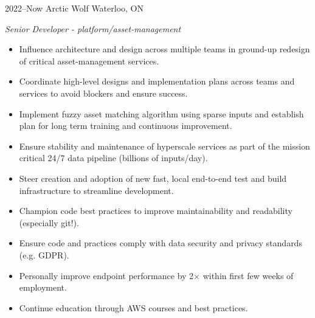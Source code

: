 \documentclass[a4paper,nocolors]{cv-friggeri-ben}
\begin{document}
\begin{entrylist}

\vspace{4pt}
\entry
    {2022--Now}
    {Arctic Wolf}
    {Waterloo, ON}
    {\emph{Senior Developer - platform/asset-management}
    \begin{itemize}
        \item Influence architecture and design across multiple teams in
            ground-up redesign of critical asset-management services.
        \item Coordinate high-level designs and implementation plans across
            teams and services to avoid blockers and ensure success.
        \item Implement fuzzy asset matching algorithm using sparse inputs and
            establish plan for long term training and continuous improvement.
        \item Ensure stability and maintenance of hyperscale services as part of
            the mission critical 24/7 data pipeline (billions of inputs/day).
        \item Steer creation and adoption of new fast, local end-to-end test
            and build infrastructure to streamline development.
        \item Champion code best practices to improve maintainability and
            readability (especially git!).
        \item Ensure code and practices comply with data security and privacy
            standards (e.g. GDPR).
        \item Personally improve endpoint performance by 2$\times$ within first
            few weeks of employment.
        \item Continue education through AWS courses and best practices.
    \end{itemize}}


\end{entrylist}
\end{document}
